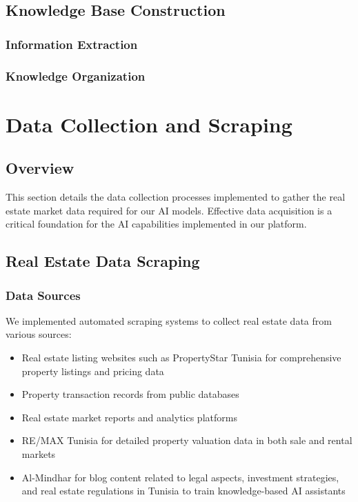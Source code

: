 \subsection{Knowledge Base Construction}
\subsubsection{Information Extraction}


\subsubsection{Knowledge Organization}

\section{Data Collection and Scraping}
\subsection{Overview}
This section details the data collection processes implemented to gather the real estate market data required for our AI models. Effective data acquisition is a critical foundation for the AI capabilities implemented in our platform.

\subsection{Real Estate Data Scraping}
\subsubsection{Data Sources}
We implemented automated scraping systems to collect real estate data from various sources:
\begin{itemize}
    \item Real estate listing websites such as PropertyStar Tunisia \cite{PropertyStarTunisia} for comprehensive property listings and pricing data
    \item Property transaction records from public databases
    \item Real estate market reports and analytics platforms
    \item RE/MAX Tunisia \cite{RemaxTunisia} for detailed property valuation data in both sale and rental markets
    \item Al-Mindhar \cite{AlMindhar} for blog content related to legal aspects, investment strategies, and real estate regulations in Tunisia to train knowledge-based AI assistants
\end{itemize}
\newpage
